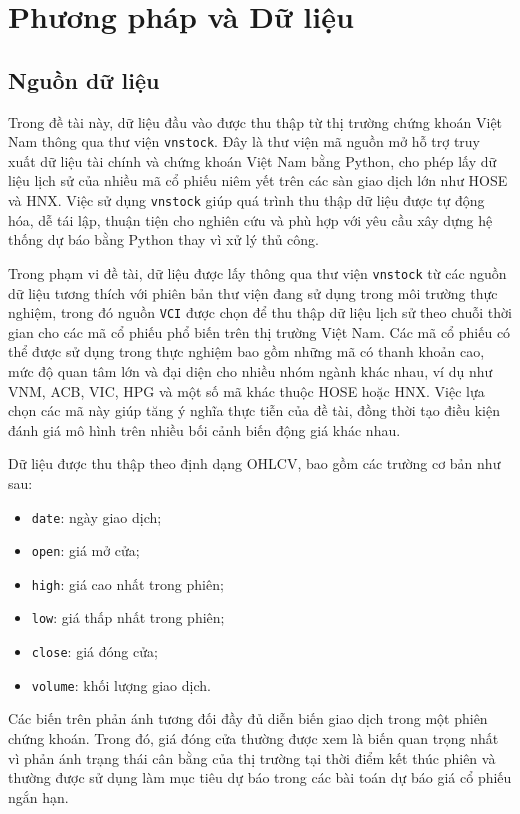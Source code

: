﻿\chapter{Phương pháp và Dữ liệu}
\label{chap:chuong3_b}

\section{Nguồn dữ liệu}
\label{sec:nguon_du_lieu}

Trong đề tài này, dữ liệu đầu vào được thu thập từ thị trường chứng khoán Việt Nam thông qua thư viện \texttt{vnstock}. Đây là thư viện mã nguồn mở hỗ trợ truy xuất dữ liệu tài chính và chứng khoán Việt Nam bằng Python, cho phép lấy dữ liệu lịch sử của nhiều mã cổ phiếu niêm yết trên các sàn giao dịch lớn như HOSE và HNX. Việc sử dụng \texttt{vnstock} giúp quá trình thu thập dữ liệu được tự động hóa, dễ tái lập, thuận tiện cho nghiên cứu và phù hợp với yêu cầu xây dựng hệ thống dự báo bằng Python thay vì xử lý thủ công.

Trong phạm vi đề tài, dữ liệu được lấy thông qua thư viện \texttt{vnstock} từ các nguồn dữ liệu tương thích với phiên bản thư viện đang sử dụng trong môi trường thực nghiệm, trong đó nguồn \texttt{VCI} được chọn để thu thập dữ liệu lịch sử theo chuỗi thời gian cho các mã cổ phiếu phổ biến trên thị trường Việt Nam. Các mã cổ phiếu có thể được sử dụng trong thực nghiệm bao gồm những mã có thanh khoản cao, mức độ quan tâm lớn và đại diện cho nhiều nhóm ngành khác nhau, ví dụ như VNM, ACB, VIC, HPG và một số mã khác thuộc HOSE hoặc HNX. Việc lựa chọn các mã này giúp tăng ý nghĩa thực tiễn của đề tài, đồng thời tạo điều kiện đánh giá mô hình trên nhiều bối cảnh biến động giá khác nhau.

Dữ liệu được thu thập theo định dạng OHLCV, bao gồm các trường cơ bản như sau:
\begin{itemize}
    \item \texttt{date}: ngày giao dịch;
    \item \texttt{open}: giá mở cửa;
    \item \texttt{high}: giá cao nhất trong phiên;
    \item \texttt{low}: giá thấp nhất trong phiên;
    \item \texttt{close}: giá đóng cửa;
    \item \texttt{volume}: khối lượng giao dịch.
\end{itemize}

Các biến trên phản ánh tương đối đầy đủ diễn biến giao dịch trong một phiên chứng khoán. Trong đó, giá đóng cửa thường được xem là biến quan trọng nhất vì phản ánh trạng thái cân bằng của thị trường tại thời điểm kết thúc phiên và thường được sử dụng làm mục tiêu dự báo trong các bài toán dự báo giá cổ phiếu ngắn hạn.

